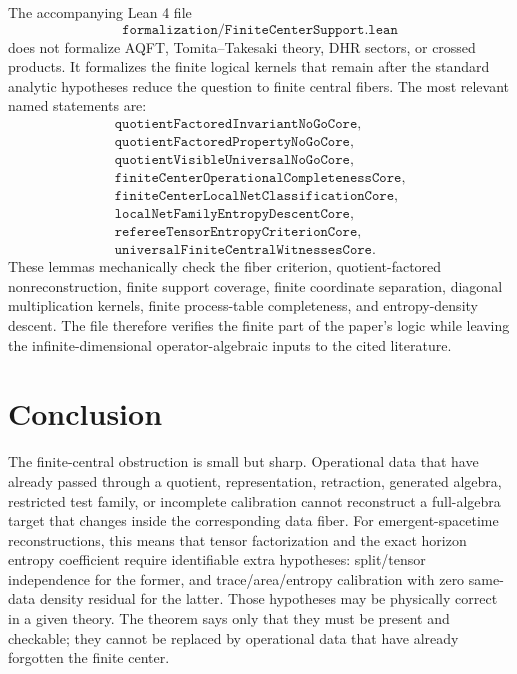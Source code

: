 \documentclass[12pt]{article}
\theoremstyle{definition}
\theoremstyle{remark}
\begin{document}
The accompanying Lean 4 file
\[
  \texttt{formalization/FiniteCenterSupport.lean}
\]
does not formalize AQFT, Tomita--Takesaki theory, DHR sectors, or crossed
products.  It formalizes the finite logical kernels that remain after the
standard analytic hypotheses reduce the question to finite central fibers.
The most relevant named statements are:
\[
\begin{gathered}
\texttt{quotientFactoredInvariantNoGoCore},\\
\texttt{quotientFactoredPropertyNoGoCore},\\
\texttt{quotientVisibleUniversalNoGoCore},\\
\texttt{finiteCenterOperationalCompletenessCore},\\
\texttt{finiteCenterLocalNetClassificationCore},\\
\texttt{localNetFamilyEntropyDescentCore},\\
\texttt{refereeTensorEntropyCriterionCore},\\
\texttt{universalFiniteCentralWitnessesCore}.
\end{gathered}
\]
These lemmas mechanically check the fiber criterion, quotient-factored
nonreconstruction, finite support coverage, finite coordinate separation,
diagonal multiplication kernels, finite process-table completeness, and
entropy-density descent.  The file therefore verifies the finite part of the
paper's logic while leaving the infinite-dimensional operator-algebraic inputs
to the cited literature.

\section{Conclusion}

The finite-central obstruction is small but sharp.  Operational data that have
already passed through a quotient, representation, retraction, generated
algebra, restricted test family, or incomplete calibration cannot reconstruct a
full-algebra target that changes inside the corresponding data fiber.  For
emergent-spacetime reconstructions, this means that tensor factorization and
the exact horizon entropy coefficient require identifiable extra hypotheses:
split/tensor independence for the former, and trace/area/entropy calibration
with zero same-data density residual for the latter.  Those hypotheses may be
physically correct in a given theory.  The theorem says only that they must be
present and checkable; they cannot be replaced by operational data that have
already forgotten the finite center.
\end{document}
